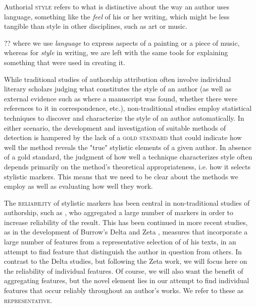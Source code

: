 \documentclass[a4paper,10pt,twoside,fleqn]{article}
\begin{document}
Authorial \textsc{style} refers to what is distinctive about the way an author
uses language,
something like the \emph{feel} of his or her writing, which might be less
tangible than style in other disciplines, such as art or music.

?? where we use \emph{language} to
express aspects of a
painting or a piece of music, whereas for \emph{style} in writing,
we are left with the same tools for explaining something that were
used in creating it.

While traditional studies of authorship attribution often involve individual literary
scholars judging what constitutes the style of an author (as well as
external evidence such as where a manuscript was found, whether there were
references to it in correspondence, etc.),
non-traditional studies employ statistical techniques to discover and characterize
the style of an author automatically.
In either scenario, the development and investigation of suitable
methods of detection is hampered by the lack of a \textsc{gold standard}
that could indicate how well the method
reveals the "true" stylistic elements of a given author.
In absence of a gold standard, the judgment of how well a technique
characterizes style often depends primarily on the method's
theoretical appropriateness, i.e. how it selects stylistic
markers.  This means that we need to be clear about the methods
we employ as well as evaluating how well they work.

The \textsc{reliability} of stylistic markers has been
central in non-traditional studies of authorship, such as ,
who aggregated a large number of markers in order to increase reliability
of the result.
This has been continued in more recent studies, as in
the development of Burrow's Delta \cite{Burrows2002delta}
and Zeta \cite{Burrows2007all}, measures that incorporate a large number of
features from a representative selection of
of his texts, in an attempt to find feature that distinguish the author
in question from others.  In contrast to the Delta studies, but following the
Zeta work, we will focus here on the reliability of individual features.  Of course,
we will also want the benefit of aggregating features, but the novel element
lies in our attempt to
find individual features that occur reliably throughout an author's works.  We
refer to these as \textsc{representative}.
\end{document}
